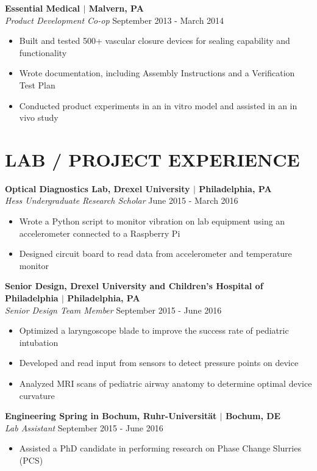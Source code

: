 \documentclass[line,resmargin,11pt]{res}
\begin{document}
\begin{resume}
\textbf{Essential Medical $|$ Malvern, PA} \\
{\sl Product Development Co-op} \hfill September 2013 - March 2014
	\begin{itemize} \itemsep -2pt
		\item  Built and tested 500+ vascular closure devices for sealing capability and functionality
		\item  Wrote documentation, including Assembly Instructions and a Verification Test Plan
		\item  Conducted product experiments in an in vitro model and assisted in an in vivo study
	\end{itemize}

\section{LAB / PROJECT EXPERIENCE}
\textbf{Optical Diagnostics Lab, Drexel University $|$ Philadelphia, PA} \\
{\sl Hess Undergraduate Research Scholar} \hfill June 2015 - March 2016
	\begin{itemize}  \itemsep -2pt
		\item  Wrote a Python script to monitor vibration on lab equipment using an accelerometer connected to a Raspberry Pi
		\item  Designed circuit board to read data from accelerometer and temperature monitor
	\end{itemize}

\textbf{Senior Design, Drexel University and Children's Hospital of Philadelphia $|$ Philadelphia, PA} \\
{\sl Senior Design Team Member} \hfill September 2015 - June 2016 \\
\begin{itemize} \itemsep -2pt
	\item  Optimized a laryngoscope blade to improve the success rate of pediatric intubation
	\item  Developed and read input from sensors to detect pressure points on device
	\item  Analyzed MRI scans of pediatric airway anatomy to determine optimal device curvature
\end{itemize}

\textbf{Engineering Spring in Bochum, Ruhr-Universit{\"a}t $|$ Bochum, DE} \\
{\sl Lab Assistant} \hfill September 2015 - June 2016 \\
\begin{itemize} \itemsep -2pt
	\item  Assisted a PhD candidate in performing research on Phase Change Slurries (PCS)
\end{itemize}

\end{resume}
\end{document}
